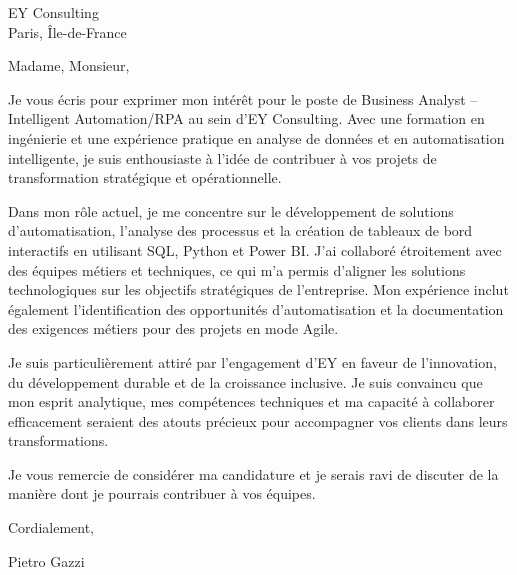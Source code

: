 \documentclass[a4paper,10pt]{letter}
\begin{document}
\begin{letter}{EY Consulting\\ Paris, Île-de-France}

\opening{Madame, Monsieur,}

Je vous écris pour exprimer mon intérêt pour le poste de Business Analyst – Intelligent Automation/RPA au sein d’EY Consulting. Avec une formation en ingénierie et une expérience pratique en analyse de données et en automatisation intelligente, je suis enthousiaste à l'idée de contribuer à vos projets de transformation stratégique et opérationnelle.

Dans mon rôle actuel, je me concentre sur le développement de solutions d'automatisation, l'analyse des processus et la création de tableaux de bord interactifs en utilisant SQL, Python et Power BI. J'ai collaboré étroitement avec des équipes métiers et techniques, ce qui m'a permis d'aligner les solutions technologiques sur les objectifs stratégiques de l'entreprise. Mon expérience inclut également l'identification des opportunités d'automatisation et la documentation des exigences métiers pour des projets en mode Agile.

Je suis particulièrement attiré par l'engagement d’EY en faveur de l'innovation, du développement durable et de la croissance inclusive. Je suis convaincu que mon esprit analytique, mes compétences techniques et ma capacité à collaborer efficacement seraient des atouts précieux pour accompagner vos clients dans leurs transformations.

Je vous remercie de considérer ma candidature et je serais ravi de discuter de la manière dont je pourrais contribuer à vos équipes.

\closing{Cordialement,}
\vspace{-2cm}
Pietro Gazzi

\end{letter}
\end{document}
